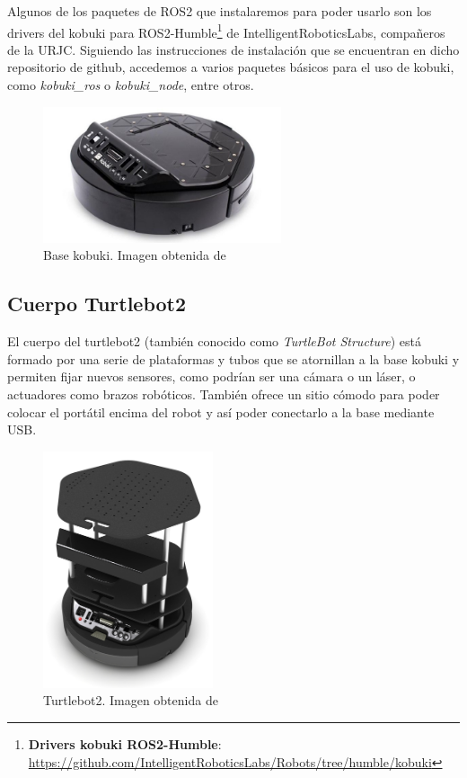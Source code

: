Algunos de los paquetes de ROS2 que instalaremos para poder usarlo son los drivers del kobuki para ROS2-Humble\footnote{\textbf{Drivers kobuki ROS2-Humble}: \url{https://github.com/IntelligentRoboticsLabs/Robots/tree/humble/kobuki}} de IntelligentRoboticsLabs, compañeros de la URJC. Siguiendo las instrucciones de instalación que se encuentran en dicho repositorio de github, accedemos a varios paquetes básicos para el uso de kobuki, como \textit{kobuki\_ros} o \textit{kobuki\_node}, entre otros.

\begin{figure} [H]
    \begin{center}
        \includegraphics[width=7cm]{figs/c3/kobuki_base.jpg}
    \end{center}
    \caption[Kobuki base]{Base kobuki. Imagen obtenida de \cite{kobuki_base}}
    \label{fig:kobuki_base}
\end{figure}

\subsection{Cuerpo Turtlebot2}
\label{subsec:turtlebot2_body}
El cuerpo del turtlebot2 (también conocido como \textit{TurtleBot Structure}) está formado por una serie de plataformas y tubos que se atornillan a la base kobuki y permiten fijar nuevos sensores, como podrían ser una cámara o un láser, o actuadores como brazos robóticos. También ofrece un sitio cómodo para poder colocar el portátil encima del robot y así poder conectarlo a la base mediante USB. 


\begin{figure} [H]
    \begin{center}
        \includegraphics[width=5cm]{figs/c3/turtlebot2_body.jpg}
    \end{center}
    \caption[Turtlebot2]{Turtlebot2. Imagen obtenida de \cite{turtlebot_2_structure}}
    \label{fig:turtlebot_2_structure}
\end{figure}

